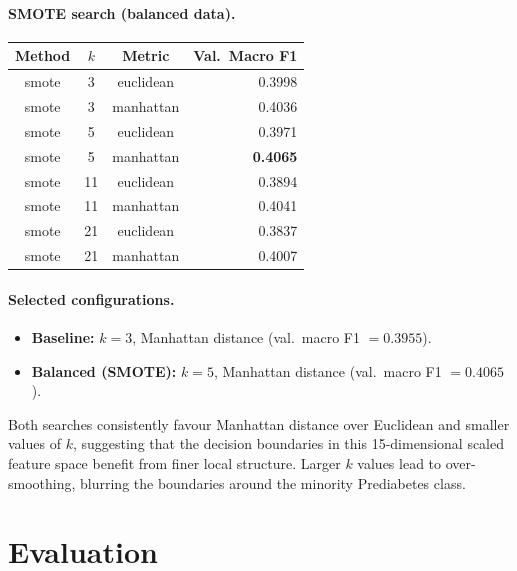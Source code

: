 \documentclass[12pt,a4paper]{article}
\begin{document}
\paragraph{SMOTE search (balanced data).}

\begin{center}
\begin{tabular}{cccr}
  \toprule
  \textbf{Method} & $k$ & \textbf{Metric} & \textbf{Val.\ Macro F1} \\
  \midrule
  smote & 3  & euclidean & 0.3998 \\
  smote & 3  & manhattan & 0.4036 \\
  smote & 5  & euclidean & 0.3971 \\
  smote & 5  & manhattan & \textbf{0.4065} \\
  smote & 11 & euclidean & 0.3894 \\
  smote & 11 & manhattan & 0.4041 \\
  smote & 21 & euclidean & 0.3837 \\
  smote & 21 & manhattan & 0.4007 \\
  \bottomrule
\end{tabular}
\end{center}

\paragraph{Selected configurations.}
\begin{itemize}
  \item \textbf{Baseline:} $k = 3$, Manhattan distance
        (val.\ macro F1 $= 0.3955$).
  \item \textbf{Balanced (SMOTE):} $k = 5$, Manhattan distance
        (val.\ macro F1 $= 0.4065$).
\end{itemize}

Both searches consistently favour Manhattan distance over Euclidean and smaller
values of $k$, suggesting that the decision boundaries in this 15-dimensional
scaled feature space benefit from finer local structure.  Larger $k$ values lead
to over-smoothing, blurring the boundaries around the minority Prediabetes class.

\section{Evaluation}
\label{sec:eval}
\end{document}

